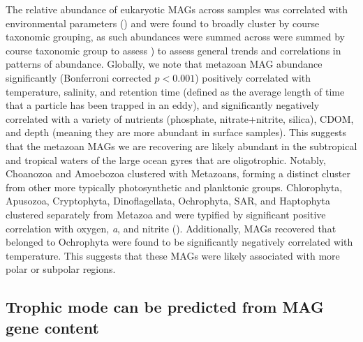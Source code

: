 \documentclass[12pt]{article}
\numberwithin{equation}{section}
\begin{document}
The relative abundance of eukaryotic MAGs across samples was correlated with environmental parameters () and were found to broadly cluster by course taxonomic grouping, as such abundances were summed across were summed by course taxonomic group to assess  ) to assess general trends and correlations in patterns of abundance. Globally, we note that metazoan MAG abundance significantly (Bonferroni corrected $p<0.001$) positively correlated with temperature, salinity, and retention time (defined as the average length of time that a particle has been trapped in an eddy), and significantly negatively correlated with a variety of nutrients (phosphate, nitrate+nitrite, silica), CDOM, and depth (meaning they are more abundant in surface samples). This suggests that the metazoan MAGs we are recovering are likely abundant in the subtropical and tropical waters of the large ocean gyres that are oligotrophic. Notably, Choanozoa and Amoebozoa clustered with Metazoans, forming a distinct cluster from other more typically photosynthetic and planktonic groups. Chlorophyta, Apusozoa, Cryptophyta, Dinoflagellata, Ochrophyta, SAR, and Haptophyta clustered separately from Metazoa and were typified by significant positive correlation with oxygen, \textit{a}, and nitrite (). Additionally, MAGs recovered that belonged to Ochrophyta were found to be significantly negatively correlated with temperature. This suggests that these MAGs were likely associated with more polar or subpolar regions.


\subsection*{Trophic mode can be predicted from MAG gene content}
\end{document}
